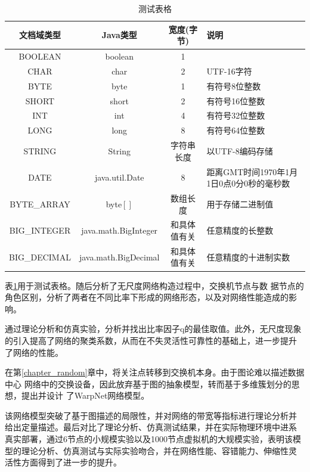 \documentclass[bachelor,winfonts]{jnuthesis} %
\begin{document}
    \begin{table}
        \centering
        \begin{tabular}{cccp{38mm}}
            \toprule
            \textbf{文档域类型} & \textbf{Java类型} & \textbf{宽度(字节)} & \textbf{说明} \\
            \midrule
            BOOLEAN  & boolean &  1  & \\
            CHAR     & char    &  2  & UTF-16字符 \\
            BYTE     & byte    &  1  & 有符号8位整数 \\
            SHORT    & short   &  2  & 有符号16位整数 \\
            INT      & int     &  4  & 有符号32位整数 \\
            LONG     & long    &  8  & 有符号64位整数 \\
            STRING   & String  &  字符串长度  & 以UTF-8编码存储 \\
            DATE     & java.util.Date & 8 & 距离GMT时间1970年1月1日0点0分0秒的毫秒数 \\
            BYTE\_ARRAY & byte$[]$ & 数组长度 & 用于存储二进制值 \\
            BIG\_INTEGER & java.math.BigInteger & 和具体值有关 & 任意精度的长整数 \\
            BIG\_DECIMAL & java.math.BigDecimal & 和具体值有关 & 任意精度的十进制实数 \\
            \bottomrule
        \end{tabular}
        \caption{测试表格}\label{table:test5}
    \end{table}
    
    表\ref{table:test5}用于测试表格。随后分析了无尺度网络构造过程中，交换机节点与数
    据节点的角色区别，分析了两者在不同比率下形成的网络形态，以及对网络性能造成的影响。
    
    通过理论分析和仿真实验，分析并找出比率因子q的最佳取值。此外，无尺度现象
    的引入提高了网络的聚类系数，从而在不失灵活性可靠性的基础上，进一步提升
    了网络的性能。
    
    在第\ref{chapter_random}章中，将关注点转移到交换机本身。由于图论难以描述数据中心
    网络中的交换设备，因此放弃基于图的抽象模型，转而基于多维簇划分的思想，提出并设计
    了WarpNet网络模型。
    
    该网络模型突破了基于图描述的局限性，并对网络的带宽等指标进行理论分析并
    给出定量描述。最后对比了理论分析、仿真测试结果，并在实际物理环境中进系
    真实部署，通过6节点的小规模实验以及1000节点虚拟机的大规模实验，表明该模
    型的理论分析、仿真测试与实际实验吻合，并在网络性能、容错能力、伸缩性灵
    活性方面得到了进一步的提升。
    
\end{document}
